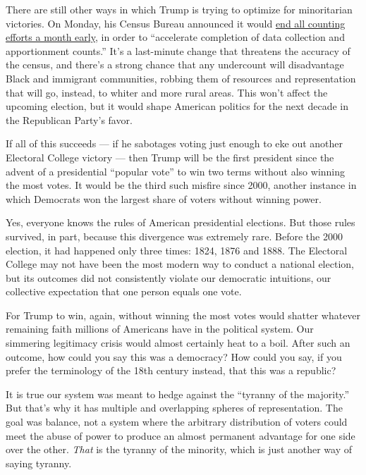 There are still other ways in which Trump is trying to optimize for
minoritarian victories. On Monday, his Census Bureau announced it would
\href{https://www.npr.org/2020/08/03/898548910/census-cut-short-a-month-rushes-to-finish-all-counting-efforts-by-sept-30}{end
all counting efforts a month early}, in order to ``accelerate completion
of data collection and apportionment counts.'' It's a last-minute change
that threatens the accuracy of the census, and there's a strong chance
that any undercount will disadvantage Black and immigrant communities,
robbing them of resources and representation that will go, instead, to
whiter and more rural areas. This won't affect the upcoming election,
but it would shape American politics for the next decade in the
Republican Party's favor.

If all of this succeeds --- if he sabotages voting just enough to eke
out another Electoral College victory --- then Trump will be the first
president since the advent of a presidential ``popular vote'' to win two
terms without also winning the most votes. It would be the third such
misfire since 2000, another instance in which Democrats won the largest
share of voters without winning power.

Yes, everyone knows the rules of American presidential elections. But
those rules survived, in part, because this divergence was extremely
rare. Before the 2000 election, it had happened only three times: 1824,
1876 and 1888. The Electoral College may not have been the most modern
way to conduct a national election, but its outcomes did not
consistently violate our democratic intuitions, our collective
expectation that one person equals one vote.

For Trump to win, again, without winning the most votes would shatter
whatever remaining faith millions of Americans have in the political
system. Our simmering legitimacy crisis would almost certainly heat to a
boil. After such an outcome, how could you say this was a democracy? How
could you say, if you prefer the terminology of the 18th century
instead, that this was a republic?

It is true our system was meant to hedge against the ``tyranny of the
majority.'' But that's why it has multiple and overlapping spheres of
representation. The goal was balance, not a system where the arbitrary
distribution of voters could meet the abuse of power to produce an
almost permanent advantage for one side over the other. \emph{That} is
the tyranny of the minority, which is just another way of saying
tyranny.


